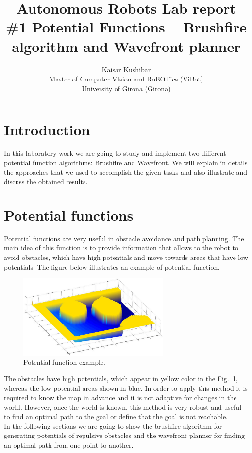 \documentclass[a4paper]{article}
\begin{document}
\title{Autonomous Robots Lab report \\ \#1 Potential Functions – Brushfire algorithm and
Wavefront planner}
\author{Kaisar Kushibar\\
Master of Computer VIsion and RoBOTics (ViBot)\\University of Girona (Girona)}

\maketitle


\section{Introduction}
In this laboratory work we are going to study and implement two different potential function algorithms: Brushfire and Wavefront. We will explain in details the approaches that we used to accomplish the given tasks and also illustrate and discuss the obtained results.
\section{Potential functions}
Potential functions are very useful in obstacle avoidance and path planning. The main idea of this function is to provide information that allows to the robot to avoid obstacles, which have high potentials and move towards areas that have low potentials. The figure below illustrates an example of potential function.
\begin{figure}[H]
\centering
\includegraphics[width=3in]{potential-function}
\caption{Potential function example.}
\label{fig:potentialfunction}
\end{figure}
The obstacles have high potentials, which appear in yellow color in the Fig.~\ref{fig:potentialfunction}, whereas the low potential areas shown in blue. In order to apply this method it is required to know the map in advance and it is not adaptive for changes in the world. However, once the world is known, this method is very robust and useful to find an optimal path to the goal or define that the goal is not reachable.\\
In the following sections we are going to show the brushfire algorithm for generating potentials of repulsive obstacles and the wavefront planner for finding an optimal path from one point to another.
\end{document}
